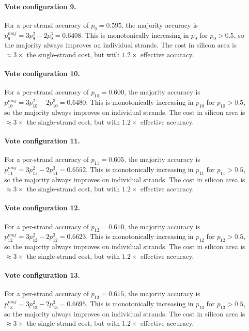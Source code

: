 \paragraph{Vote configuration 9.}
For a per-strand accuracy of $p_{9} = 0.595$, the majority
accuracy is $p_{9}^{maj} = 3p_{9}^2 - 2p_{9}^3 = 0.6408$.
This is monotonically increasing in $p_{9}$ for $p_{9} > 0.5$, so the
majority always improves on individual strands. The cost in silicon area is
$\approx 3\times$ the single-strand cost, but with $1.2\times$ effective accuracy.

\paragraph{Vote configuration 10.}
For a per-strand accuracy of $p_{10} = 0.600$, the majority
accuracy is $p_{10}^{maj} = 3p_{10}^2 - 2p_{10}^3 = 0.6480$.
This is monotonically increasing in $p_{10}$ for $p_{10} > 0.5$, so the
majority always improves on individual strands. The cost in silicon area is
$\approx 3\times$ the single-strand cost, but with $1.2\times$ effective accuracy.

\paragraph{Vote configuration 11.}
For a per-strand accuracy of $p_{11} = 0.605$, the majority
accuracy is $p_{11}^{maj} = 3p_{11}^2 - 2p_{11}^3 = 0.6552$.
This is monotonically increasing in $p_{11}$ for $p_{11} > 0.5$, so the
majority always improves on individual strands. The cost in silicon area is
$\approx 3\times$ the single-strand cost, but with $1.2\times$ effective accuracy.

\paragraph{Vote configuration 12.}
For a per-strand accuracy of $p_{12} = 0.610$, the majority
accuracy is $p_{12}^{maj} = 3p_{12}^2 - 2p_{12}^3 = 0.6623$.
This is monotonically increasing in $p_{12}$ for $p_{12} > 0.5$, so the
majority always improves on individual strands. The cost in silicon area is
$\approx 3\times$ the single-strand cost, but with $1.2\times$ effective accuracy.

\paragraph{Vote configuration 13.}
For a per-strand accuracy of $p_{13} = 0.615$, the majority
accuracy is $p_{13}^{maj} = 3p_{13}^2 - 2p_{13}^3 = 0.6695$.
This is monotonically increasing in $p_{13}$ for $p_{13} > 0.5$, so the
majority always improves on individual strands. The cost in silicon area is
$\approx 3\times$ the single-strand cost, but with $1.2\times$ effective accuracy.

